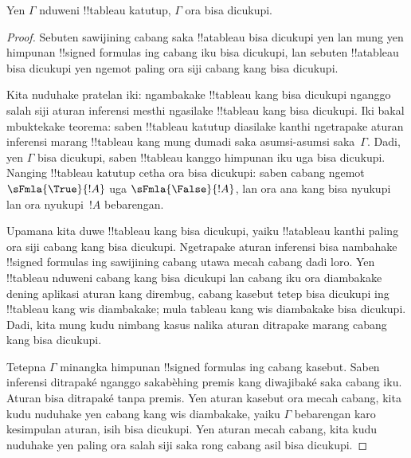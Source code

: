\documentclass[../../../include/open-logic-section]{subfiles}
\begin{document}
\begin{thm}[Kasahihan]
  Yen $\Gamma$ nduweni !!{tableau} katutup, $\Gamma$ ora bisa dicukupi.
\end{thm}

\begin{proof}
Sebuten sawijining cabang saka !!a{tableau} bisa dicukupi yen
lan mung yen himpunan !!{signed formula}s ing cabang iku bisa dicukupi,
lan sebuten !!a{tableau} bisa dicukupi yen ngemot paling ora
siji cabang kang bisa dicukupi.

Kita nuduhake pratelan iki: ngambakake !!{tableau} kang bisa dicukupi
nganggo salah siji aturan inferensi mesthi ngasilake !!{tableau} kang
bisa dicukupi. Iki bakal mbuktekake teorema: saben !!{tableau} katutup
diasilake kanthi ngetrapake aturan inferensi marang !!{tableau} kang
mung dumadi saka asumsi-asumsi saka~$\Gamma$. Dadi, yen $\Gamma$ bisa
dicukupi, saben !!{tableau} kanggo himpunan iku uga bisa dicukupi.
Nanging !!{tableau} katutup cetha ora bisa dicukupi: saben cabang
ngemot $\sFmla{\True}{!A}$ uga $\sFmla{\False}{!A}$, lan ora ana
 kang bisa nyukupi lan ora nyukupi~$!A$ bebarengan.

Upamana kita duwe !!{tableau} kang bisa dicukupi, yaiku !!a{tableau}
kanthi paling ora siji cabang kang bisa dicukupi. Ngetrapake aturan
inferensi bisa nambahake !!{signed formula}s ing sawijining cabang
utawa mecah cabang dadi loro. Yen !!{tableau} nduweni cabang kang bisa
dicukupi lan cabang iku ora diambakake dening aplikasi aturan kang
dirembug, cabang kasebut tetep bisa dicukupi ing !!{tableau} kang wis
  diambakake; mula tableau kang wis diambakake bisa dicukupi. Dadi,
kita mung kudu nimbang kasus nalika aturan ditrapake marang cabang
kang bisa dicukupi.

Tetepna $\Gamma$ minangka himpunan !!{signed formula}s ing cabang kasebut.
Saben inferensi ditrapaké nganggo sakabèhing premis kang diwajibaké saka cabang iku.
Aturan \Cut{} bisa ditrapaké tanpa premis. Yen aturan kasebut ora mecah cabang, kita kudu
nuduhake yen cabang kang wis diambakake, yaiku $\Gamma$ bebarengan
karo kesimpulan aturan, isih bisa dicukupi. Yen aturan mecah cabang,
kita kudu nuduhake yen paling ora salah siji saka rong cabang asil
bisa dicukupi.
  

\end{proof}
\end{document}
